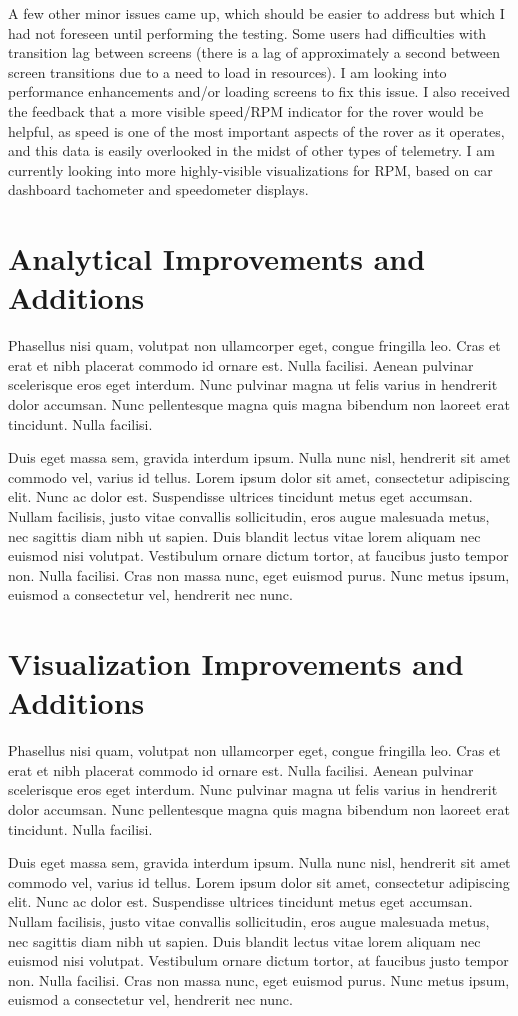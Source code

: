 A few other minor issues came up, which should be easier to address but which I had not foreseen until performing the testing. Some users had difficulties with transition lag between screens (there is a lag of approximately a second between screen transitions due to a need to load in resources). I am looking into performance enhancements and/or loading screens to fix this issue. I also received the feedback that a more visible speed/RPM indicator for the rover would be helpful, as speed is one of the most important aspects of the rover as it operates, and this data is easily overlooked in the midst of other types of telemetry. I am currently looking into more highly-visible visualizations for RPM, based on car dashboard tachometer and speedometer displays.

\section{Analytical Improvements and Additions}

Phasellus nisi quam, volutpat non ullamcorper eget, congue fringilla leo. Cras et erat et nibh placerat commodo id ornare est. Nulla facilisi. Aenean pulvinar scelerisque eros eget interdum. Nunc pulvinar magna ut felis varius in hendrerit dolor accumsan. Nunc pellentesque magna quis magna bibendum non laoreet erat tincidunt. Nulla facilisi.

Duis eget massa sem, gravida interdum ipsum. Nulla nunc nisl, hendrerit sit amet commodo vel, varius id tellus. Lorem ipsum dolor sit amet, consectetur adipiscing elit. Nunc ac dolor est. Suspendisse ultrices tincidunt metus eget accumsan. Nullam facilisis, justo vitae convallis sollicitudin, eros augue malesuada metus, nec sagittis diam nibh ut sapien. Duis blandit lectus vitae lorem aliquam nec euismod nisi volutpat. Vestibulum ornare dictum tortor, at faucibus justo tempor non. Nulla facilisi. Cras non massa nunc, eget euismod purus. Nunc metus ipsum, euismod a consectetur vel, hendrerit nec nunc.

\section{Visualization Improvements and Additions}

Phasellus nisi quam, volutpat non ullamcorper eget, congue fringilla leo. Cras et erat et nibh placerat commodo id ornare est. Nulla facilisi. Aenean pulvinar scelerisque eros eget interdum. Nunc pulvinar magna ut felis varius in hendrerit dolor accumsan. Nunc pellentesque magna quis magna bibendum non laoreet erat tincidunt. Nulla facilisi.

Duis eget massa sem, gravida interdum ipsum. Nulla nunc nisl, hendrerit sit amet commodo vel, varius id tellus. Lorem ipsum dolor sit amet, consectetur adipiscing elit. Nunc ac dolor est. Suspendisse ultrices tincidunt metus eget accumsan. Nullam facilisis, justo vitae convallis sollicitudin, eros augue malesuada metus, nec sagittis diam nibh ut sapien. Duis blandit lectus vitae lorem aliquam nec euismod nisi volutpat. Vestibulum ornare dictum tortor, at faucibus justo tempor non. Nulla facilisi. Cras non massa nunc, eget euismod purus. Nunc metus ipsum, euismod a consectetur vel, hendrerit nec nunc.